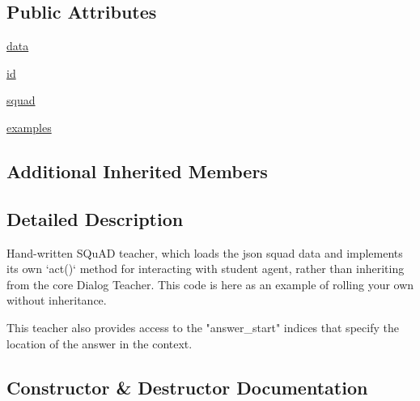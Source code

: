 \subsection*{Public Attributes}
\begin{DoxyCompactItemize}
\item 
\hyperlink{classparlai_1_1tasks_1_1squad2_1_1agents_1_1IndexTeacher_abb04c653cc52c06137a52a47c68e02b3}{data}
\item 
\hyperlink{classparlai_1_1tasks_1_1squad2_1_1agents_1_1IndexTeacher_a8d371520b687f1035ce70e88c0ea4e91}{id}
\item 
\hyperlink{classparlai_1_1tasks_1_1squad2_1_1agents_1_1IndexTeacher_a6f328f6c5362d94d609cc8dad6da9fca}{squad}
\item 
\hyperlink{classparlai_1_1tasks_1_1squad2_1_1agents_1_1IndexTeacher_ae83acc001e0059480f6d8a57e260f95b}{examples}
\end{DoxyCompactItemize}
\subsection*{Additional Inherited Members}


\subsection{Detailed Description}
\begin{DoxyVerb}Hand-written SQuAD teacher, which loads the json squad data and implements its own
`act()` method for interacting with student agent, rather than inheriting from the
core Dialog Teacher. This code is here as an example of rolling your own without
inheritance.

This teacher also provides access to the "answer_start" indices that specify the
location of the answer in the context.
\end{DoxyVerb}
 

\subsection{Constructor \& Destructor Documentation}
\mbox{\label{classparlai_1_1tasks_1_1squad2_1_1agents_1_1IndexTeacher_a11e053a7da91de71216a538505257ae2}} 
